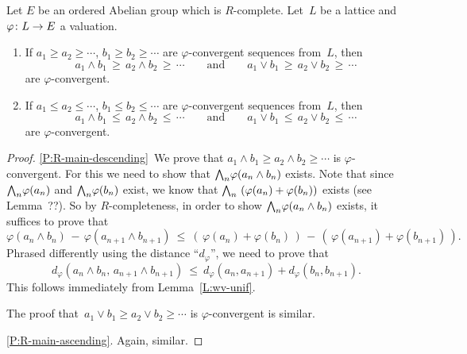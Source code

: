 \documentclass[main.tex]{subfiles}
\begin{document}
\begin{prop}
\label{P:R-main}
Let  $E$ be an ordered Abelian group which is $R$-complete.
Let~$L$ be a lattice and $\varphi\colon L \rightarrow E$ a valuation.
\begin{enumerate}
\item
\label{P:R-main-descending}
If  $a_1 \geq a_2 \geq \dotsb$,
$b_1 \geq b_2 \geq \dotsb$
are  $\varphi$-convergent
sequences from~$L$,
then
\begin{equation*}
a_1 \wedge b_1 \,\geq\, a_2 \wedge b_2 \,\geq\, \dotsb
\qquad\text{and}\qquad
a_1 \vee b_1 \,\geq\, a_2 \vee b_2 \,\geq\, \dotsb
\end{equation*}
are $\varphi$-convergent.

\item
\label{P:R-main-ascending}
If  $a_1 \leq a_2 \leq \dotsb$,
$b_1 \leq b_2 \leq \dotsb$
are  $\varphi$-convergent
sequences from~$L$,
then
\begin{equation*}
a_1 \wedge b_1 \,\leq\, a_2 \wedge b_2 \,\leq\, \dotsb
\qquad\text{and}\qquad
a_1 \vee b_1 \,\leq\, a_2 \vee b_2 \,\leq\, \dotsb
\end{equation*}
are $\varphi$-convergent.
\end{enumerate}
\end{prop}
\begin{proof}
\ref{P:R-main-descending}\ 
We prove that $a_1 \wedge b_1 \geq a_2 \wedge b_2 \geq\dotsb$
is $\varphi$-convergent.
For this we need to show that $\textstyle{\bigwedge}_n \varphi(a_n\wedge b_n)$ exists.
Note that since $\textstyle{\bigwedge}_n \varphi (a_n)$
and $\textstyle{\bigwedge}_n \varphi(b_n)$ exist,
we know that $\textstyle{\bigwedge}_n \ (\varphi(a_n) + \varphi(b_n))$
exists (see Lemma~??).
So by $R$-completeness,
in order to show $\textstyle{\bigwedge}_n\varphi(a_n \wedge b_n)$ exists,
it suffices to prove that 
\begin{equation*}
\varphi(a_{n}\wedge b_{n}) \,-\, \varphi(a_{n+1} \wedge b_{n+1}) 
\ \leq\ 
(\,\varphi(a_{n}) + \varphi(b_{n})\,) 
\,-\, (\,\varphi(a_{n+1}) + \varphi(b_{n+1})\,).
\end{equation*}
Phrased differently
using the distance ``$d_\varphi$'',
we need to prove that
\begin{equation*}
d_\varphi(a_{n}\wedge b_{n},\, a_{n+1} \wedge b_{n+1}) 
\ \leq\ 
d_\varphi(a_{n},a_{n+1}) + d_\varphi(b_{n},b_{n+1}).
\end{equation*}
This follows immediately from Lemma~\ref{L:wv-unif}.

The 
proof that~$a_1 \vee b_1 \geq a_2 \vee b_2 \geq \dotsb$
is $\varphi$-convergent is similar.

\ref{P:R-main-ascending}.  Again, similar.
\end{proof}
\end{document}

